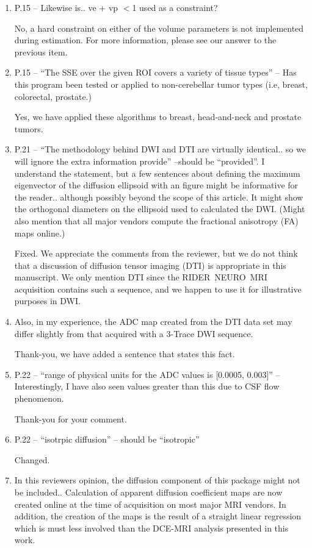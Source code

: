 \documentclass[11pt]{article}
\begin{document}
\begin{enumerate}
\item P.15 – Likewise is.. ve + vp $<$1 used as a constraint?

  No, a hard constraint on either of the volume parameters is not
  implemented during estimation.  For more information, please see our
  answer to the previous item.

\item P.15 – ``The SSE over the given ROI covers a variety of tissue
  types'' – Has this program been tested or applied to non-cerebellar
  tumor types (i.e, breast, colorectal, prostate.)

  Yes, we have applied these algorithms to breast, head-and-neck and
  prostate tumors.

\item P.21 – ``The methodology behind DWI and DTI are virtually
  identical.. so we will ignore the extra information provide''
  –should be ``provided''.  I understand the statement, but a few
  sentences about defining the maximum eigenvector of the diffusion
  ellipsoid with an figure might be informative for the
  reader.. although possibly beyond the scope of this article. It
  might show the orthogonal diameters on the ellipsoid used to
  calculated the DWI. (Might also mention that all major vendors
  compute the fractional anisotropy (FA) maps online.)

  Fixed.  We appreciate the comments from the reviewer, but we do not
  think that a discussion of diffusion tensor imaging (DTI) is
  appropriate in this manuscript.  We only mention DTI since the
  RIDER~NEURO~MRI acquisition contains such a sequence, and we happen
  to use it for illustrative purposes in DWI.

\item Also, in my experience, the ADC map created from the DTI data
  set may differ slightly from that acquired with a 3-Trace DWI
  sequence.

  Thank-you, we have added a sentence that states this fact.

\item P.22 – ``range of physical units for the ADC values is [0.0005,
  0.003]'' – Interestingly, I have also seen values greater than this
  due to CSF flow phenomenon.

  Thank-you for your comment.

\item P.22 – ``isotrpic diffusion'' – should be ``isotropic''

  Changed.

\item In this reviewers opinion, the diffusion component of this
  package might not be included..  Calculation of apparent diffusion
  coefficient maps are now created online at the time of acquisition
  on most major MRI vendors.  In addition, the creation of the maps is
  the result of a straight linear regression which is must less
  involved than the DCE-MRI analysis presented in this work.


\end{enumerate}
\end{document}
